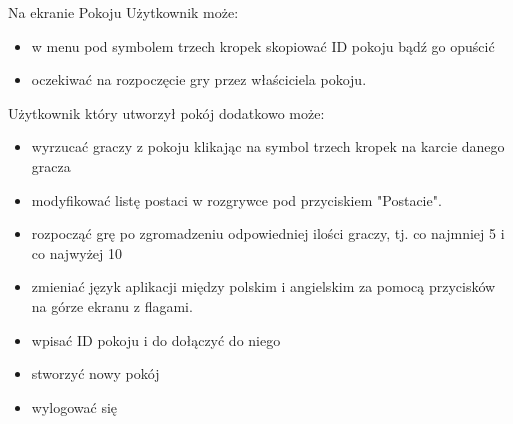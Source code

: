 \documentclass[12pt]{article}
\begin{document}
Na ekranie Pokoju Użytkownik może:
\begin{itemize}
    \item w menu pod symbolem trzech kropek skopiować ID pokoju bądź go opuścić
    \item oczekiwać na rozpoczęcie gry przez właściciela pokoju.
\end{itemize}
Użytkownik który utworzył pokój dodatkowo może:
\begin{itemize}
    \item wyrzucać graczy z pokoju klikając na symbol trzech kropek na karcie danego gracza 
    \item modyfikować listę postaci w rozgrywce pod przyciskiem "Postacie".
    \item rozpocząć grę po zgromadzeniu odpowiedniej ilości graczy, tj. co najmniej 5 i co najwyżej 10
\end{itemize}

\begin{itemize}
    \item zmieniać język aplikacji między polskim i angielskim za pomocą przycisków na górze ekranu z flagami. 
    \item wpisać ID pokoju i do dołączyć do niego
    \item stworzyć nowy pokój
    \item wylogować się
\end{itemize}



\newpage
\end{document}
